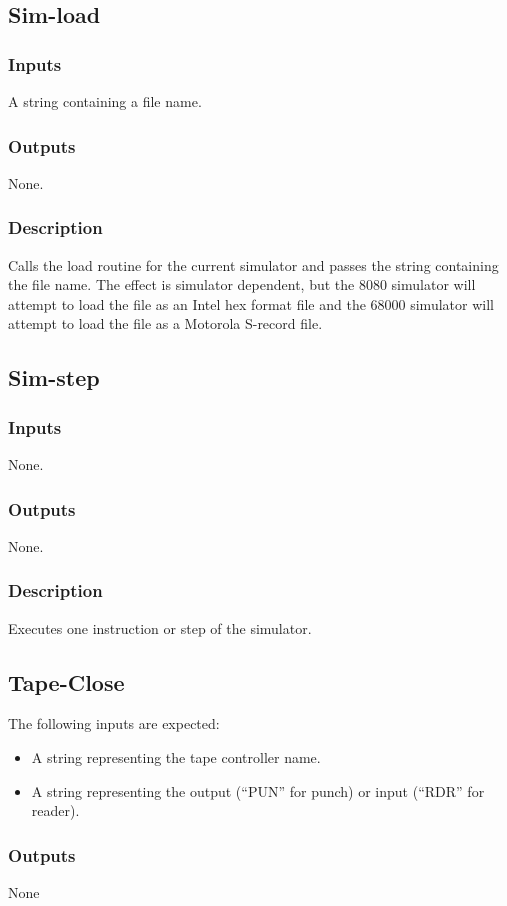 \documentclass[10pt, openany]{book}
\begin{document}
\subsection{Sim-load}
\subsubsection{Inputs}
A string containing a file name.
\subsubsection{Outputs}
None.
\subsubsection{Description}
Calls the load routine for the current simulator and passes the string containing the file name.  The effect is simulator dependent, but the 8080 simulator will attempt to load the file as an Intel hex format file and the 68000 simulator will attempt to load the file as a Motorola S-record file.

\subsection{Sim-step}
\subsubsection{Inputs}
None.
\subsubsection{Outputs}
None.
\subsubsection{Description}
Executes one instruction or step of the simulator.

\subsection{Tape-Close}
The following inputs are expected:
\begin{itemize}
  \item A string representing the tape controller name.
  \item A string representing the output (``PUN'' for punch) or input (``RDR'' for reader).
\end{itemize}
\subsubsection{Outputs}
None
\end{document}

